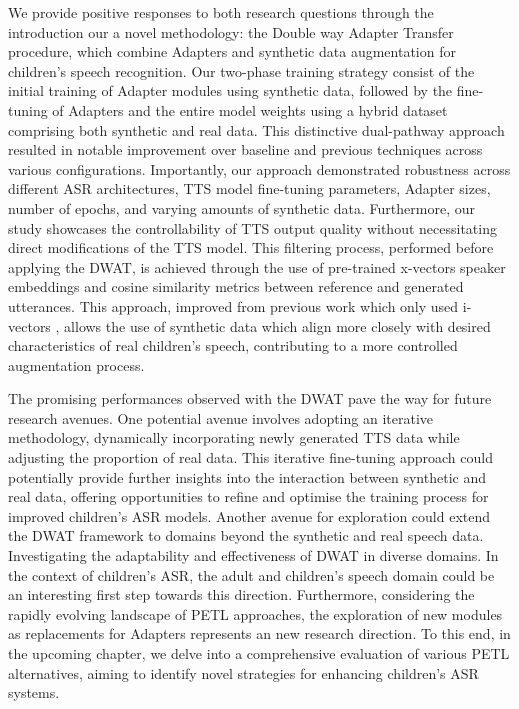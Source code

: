We provide positive responses to both research questions through the introduction our a novel methodology: the Double way Adapter Transfer procedure, which combine Adapters and synthetic data augmentation for children's speech recognition. Our two-phase training strategy consist of the initial training of Adapter modules using synthetic data, followed by the fine-tuning of Adapters and the entire model weights using a hybrid dataset comprising both synthetic and real data. This distinctive dual-pathway approach resulted in notable improvement over baseline and previous techniques across various configurations. Importantly, our approach demonstrated robustness across different \ac{ASR} architectures, \ac{TTS} model fine-tuning parameters, Adapter sizes, number of epochs, and varying amounts of synthetic data. Furthermore, our study showcases the controllability of \ac{TTS} output quality without necessitating direct modifications of the \ac{TTS} model. This filtering process, performed before applying the \ac{DWAT}, is achieved through the use of pre-trained x-vectors speaker embeddings and cosine similarity metrics between reference and generated utterances. This approach, improved from previous work which only used i-vectors \cite{wang2021towards}, allows the use of synthetic data which align more closely with desired characteristics of real children's speech, contributing to a more controlled augmentation process.

The promising performances observed with the \ac{DWAT} pave the way for future research avenues. One potential avenue involves adopting an iterative methodology, dynamically incorporating newly generated \ac{TTS} data while adjusting the proportion of real data. This iterative fine-tuning approach could potentially provide further insights into the interaction between synthetic and real data, offering opportunities to refine and optimise the training process for improved children's \ac{ASR} models.
Another avenue for exploration could extend the \ac{DWAT} framework to domains beyond the synthetic and real speech data. Investigating the adaptability and effectiveness of \ac{DWAT} in diverse domains. In the context of children's \ac{ASR}, the adult and children's speech domain could be an interesting first step towards this direction.
Furthermore, considering the rapidly evolving landscape of \ac{PETL} approaches, the exploration of new modules as replacements for Adapters represents an new research direction. To this end, in the upcoming chapter, we delve into a comprehensive evaluation of various \ac{PETL} alternatives, aiming to identify novel strategies for enhancing children's \ac{ASR} systems.